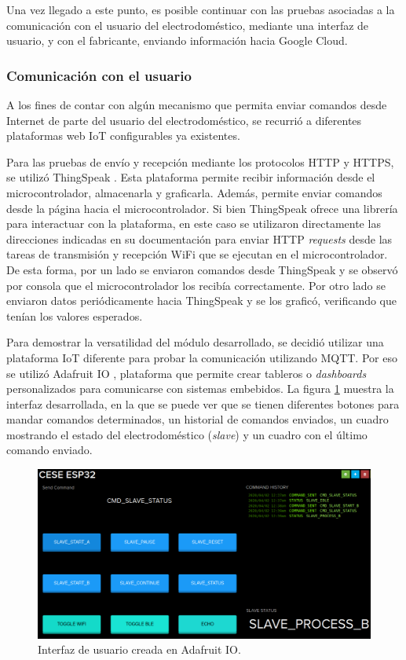 Una vez llegado a este punto, es posible continuar con las pruebas asociadas a la comunicación con el usuario del electrodoméstico, mediante una interfaz de usuario, y con el fabricante, enviando información hacia Google Cloud.

\subsubsection{Comunicación con el usuario}

A los fines de contar con algún mecanismo que permita enviar comandos desde Internet de parte del usuario del electrodoméstico, se recurrió a diferentes plataformas web IoT configurables ya existentes.

Para las pruebas de envío y recepción mediante los protocolos HTTP y HTTPS, se utilizó ThingSpeak \citep{thingspeak}. Esta plataforma permite recibir información desde el microcontrolador, almacenarla y graficarla. Además, permite enviar comandos desde la página hacia el microcontrolador. Si bien ThingSpeak ofrece una librería para interactuar con la plataforma, en este caso se utilizaron directamente las direcciones indicadas en su documentación para enviar HTTP \emph{requests} desde las tareas de transmisión y recepción WiFi que se ejecutan en el microcontrolador. De esta forma, por un lado se enviaron comandos desde ThingSpeak y se observó por consola que el microcontrolador los recibía correctamente. Por otro lado se enviaron datos periódicamente hacia ThingSpeak y se los graficó, verificando que tenían los valores esperados.

Para demostrar la versatilidad del módulo desarrollado, se decidió utilizar una plataforma IoT diferente para probar la comunicación utilizando MQTT. Por eso se utilizó Adafruit IO \citep{adafruit}, plataforma que permite crear tableros o \emph{dashboards} personalizados para comunicarse con sistemas embebidos. La figura \ref{fig:adafruit_dashboard} muestra la interfaz desarrollada, en la que se puede ver que se tienen diferentes botones para mandar comandos determinados, un historial de comandos enviados, un cuadro mostrando el estado del electrodoméstico (\emph{slave}) y un cuadro con el último comando enviado.

\begin{figure}[h]
\centering
\includegraphics[width=\textwidth]{./Figures/adafruit_dashboard.png}
\caption{Interfaz de usuario creada en Adafruit IO.}
\label{fig:adafruit_dashboard}
\end{figure}

